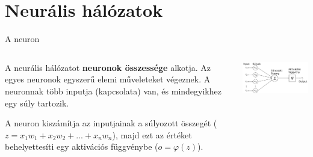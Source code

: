\documentclass[english, aspectratio=169]{beamer}
\makeatletter
\let\origtableofcontents=\tableofcontents
\def\tableofcontents{\@ifnextchar[{\origtableofcontents}{\gobbletableofcontents}}
\def\gobbletableofcontents#1{\origtableofcontents}
\makeatother
\begin{document}
\section{Neurális hálózatok}

\begin{frame}
\tableofcontents[currentsection]
\end{frame}

\begin{frame}{A neuron}
\begin{columns}
\begin{column}{.4\textwidth}
A neurális hálózatot \textbf{neuronok összessége} alkotja. Az egyes neuronok egyszerű elemi műveleteket végeznek. A neuronnak több inputja (kapcsolata) van, és mindegyikhez egy súly tartozik.\par\smallskip
A neuron kiszámítja az inputjainak a súlyozott összegét ($z=x_1w_1 + x_2w_2 + ... + x_nw_n$), majd ezt az értéket behelyettesíti egy aktivációs függvénybe ($o=\varphi(z)$). 
\end{column}
\begin{column}{.6\textwidth}
\begin{center}
\includegraphics[width=9cm, keepaspectratio]{images/ql_21.png}
\end{center}
\end{column}
\end{columns}
\end{frame}
\end{document}
